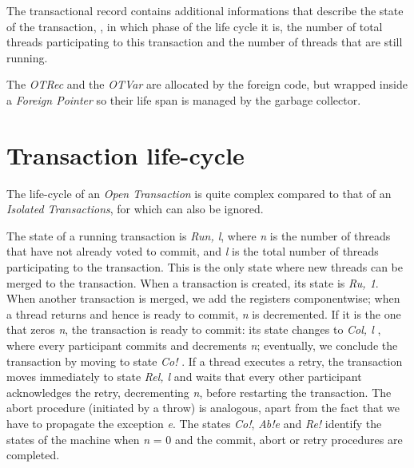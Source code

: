 The transactional record contains additional informations that describe the state of the transaction, \ie, in which phase of the life cycle it is, the number of total threads participating to this transaction and the number of threads that are still running.

The \emph{OTRec} and the \emph{OTVar} are allocated by the foreign code, but wrapped inside a \emph{Foreign Pointer} so their life span is managed by the garbage collector.



\section{Transaction life-cycle}

The life-cycle of an \emph{Open Transaction} is quite complex compared to that of an \emph{Isolated Transactions}, for which can also be ignored.

The state of a running transaction is \emph{Ru\textlangle n, l\textrangle}, where \emph{n} is the number of threads that have not already voted to commit, and \emph{l} is the total number of threads participating to the transaction.
This is the only state where new threads can be merged to the transaction. When a transaction is created, its state is \emph{Ru, 1\textrangle}.
When another transaction is merged, we add the registers componentwise; when a thread returns and hence is ready to commit, \emph{n} is decremented.
If it is the one that zeros \emph{n}, the transaction is ready to commit: its state changes to \emph{Co\textlangle l, l\textrangle} , where every participant commits and decrements \emph{n}; eventually, we conclude the transaction by moving to state \emph{Co!\textlangle \textrangle} .
If a thread executes a retry, the transaction moves immediately to state \emph{Re\textlangle l, l\textrangle} and waits that every other participant acknowledges the retry, decrementing \emph{n}, before restarting the transaction.
The abort procedure (initiated by a throw) is analogous, apart from the fact that we have to propagate the exception \emph{e}.
The states \emph{Co!\textlangle \textrangle }, \emph{Ab!\textlangle e\textrangle}  and \emph{Re!\textlangle \textrangle}  identify the states of the machine when \emph{n} = 0 and the commit, abort or retry procedures are completed.

